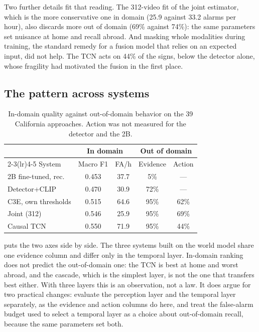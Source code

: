 \documentclass[journal]{IEEEtran}
\begin{document}
Two further details fit that reading.  The 312-video fit of the joint estimator, which is the more conservative one in domain (25.9 against 33.2 alarms per hour), also discards more out of domain (69\% against 74\%): the same parameters set nuisance at home and recall abroad.  And masking whole modalities during training, the standard remedy for a fusion model that relies on an expected input, did not help.  The TCN acts on 44\% of the signs, below the detector alone, whose fragility had motivated the fusion in the first place.

\subsection{The pattern across systems}

\begin{table}[t]
\centering
\caption{In-domain quality against out-of-domain behavior on the 39 California approaches.  Action was not measured for the detector and the 2B.}
\label{tab:tradeoff}
\footnotesize
\begin{tabular}{@{}lcccc@{}}
\toprule
& \multicolumn{2}{c}{In domain} & \multicolumn{2}{c}{Out of domain} \\
\cmidrule(lr){2-3}\cmidrule(lr){4-5}
System & Macro F1 & FA/h & Evidence & Action \\
\midrule
2B fine-tuned, rec.  & 0.453 & 37.7 & 5\%  & --- \\
Detector+CLIP        & 0.470 & 30.9 & 72\% & --- \\
C3E, own thresholds  & 0.515 & 64.6 & 95\% & 62\% \\
Joint (312)          & 0.546 & 25.9 & 95\% & 69\% \\
Causal TCN           & 0.550 & 71.9 & 95\% & 44\% \\
\bottomrule
\end{tabular}
\end{table}

 puts the two axes side by side.  The three systems built on the world model share one evidence column and differ only in the temporal layer.  In-domain ranking does not predict the out-of-domain one: the TCN is best at home and worst abroad, and the cascade, which is the simplest layer, is not the one that transfers best either.  With three layers this is an observation, not a law.  It does argue for two practical changes: evaluate the perception layer and the temporal layer separately, as the evidence and action columns do here, and treat the false-alarm budget used to select a temporal layer as a choice about out-of-domain recall, because the same parameters set both.
\end{document}
